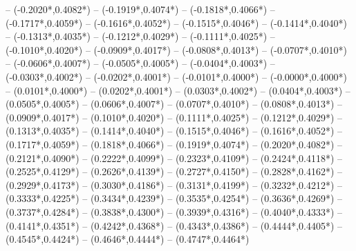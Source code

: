 {	-- ({-0.2020*\dx},{0.4082*\dy})
	-- ({-0.1919*\dx},{0.4074*\dy})
	-- ({-0.1818*\dx},{0.4066*\dy})
	-- ({-0.1717*\dx},{0.4059*\dy})
	-- ({-0.1616*\dx},{0.4052*\dy})
	-- ({-0.1515*\dx},{0.4046*\dy})
	-- ({-0.1414*\dx},{0.4040*\dy})
	-- ({-0.1313*\dx},{0.4035*\dy})
	-- ({-0.1212*\dx},{0.4029*\dy})
	-- ({-0.1111*\dx},{0.4025*\dy})
	-- ({-0.1010*\dx},{0.4020*\dy})
	-- ({-0.0909*\dx},{0.4017*\dy})
	-- ({-0.0808*\dx},{0.4013*\dy})
	-- ({-0.0707*\dx},{0.4010*\dy})
	-- ({-0.0606*\dx},{0.4007*\dy})
	-- ({-0.0505*\dx},{0.4005*\dy})
	-- ({-0.0404*\dx},{0.4003*\dy})
	-- ({-0.0303*\dx},{0.4002*\dy})
	-- ({-0.0202*\dx},{0.4001*\dy})
	-- ({-0.0101*\dx},{0.4000*\dy})
	-- ({-0.0000*\dx},{0.4000*\dy})
	-- ({0.0101*\dx},{0.4000*\dy}) %
	-- ({0.0202*\dx},{0.4001*\dy}) %
	-- ({0.0303*\dx},{0.4002*\dy}) %
	-- ({0.0404*\dx},{0.4003*\dy}) %
	-- ({0.0505*\dx},{0.4005*\dy}) %
	-- ({0.0606*\dx},{0.4007*\dy}) %
	-- ({0.0707*\dx},{0.4010*\dy}) %
	-- ({0.0808*\dx},{0.4013*\dy}) %
	-- ({0.0909*\dx},{0.4017*\dy}) %
	-- ({0.1010*\dx},{0.4020*\dy}) %
	-- ({0.1111*\dx},{0.4025*\dy}) %
	-- ({0.1212*\dx},{0.4029*\dy}) %
	-- ({0.1313*\dx},{0.4035*\dy}) %
	-- ({0.1414*\dx},{0.4040*\dy}) %
	-- ({0.1515*\dx},{0.4046*\dy}) %
	-- ({0.1616*\dx},{0.4052*\dy}) %
	-- ({0.1717*\dx},{0.4059*\dy}) %
	-- ({0.1818*\dx},{0.4066*\dy}) %
	-- ({0.1919*\dx},{0.4074*\dy}) %
	-- ({0.2020*\dx},{0.4082*\dy}) %
	-- ({0.2121*\dx},{0.4090*\dy}) %
	-- ({0.2222*\dx},{0.4099*\dy}) %
	-- ({0.2323*\dx},{0.4109*\dy}) %
	-- ({0.2424*\dx},{0.4118*\dy}) %
	-- ({0.2525*\dx},{0.4129*\dy}) %
	-- ({0.2626*\dx},{0.4139*\dy}) %
	-- ({0.2727*\dx},{0.4150*\dy}) %
	-- ({0.2828*\dx},{0.4162*\dy}) %
	-- ({0.2929*\dx},{0.4173*\dy}) %
	-- ({0.3030*\dx},{0.4186*\dy}) %
	-- ({0.3131*\dx},{0.4199*\dy}) %
	-- ({0.3232*\dx},{0.4212*\dy}) %
	-- ({0.3333*\dx},{0.4225*\dy}) %
	-- ({0.3434*\dx},{0.4239*\dy}) %
	-- ({0.3535*\dx},{0.4254*\dy}) %
	-- ({0.3636*\dx},{0.4269*\dy}) %
	-- ({0.3737*\dx},{0.4284*\dy}) %
	-- ({0.3838*\dx},{0.4300*\dy}) %
	-- ({0.3939*\dx},{0.4316*\dy}) %
	-- ({0.4040*\dx},{0.4333*\dy}) %
	-- ({0.4141*\dx},{0.4351*\dy}) %
	-- ({0.4242*\dx},{0.4368*\dy}) %
	-- ({0.4343*\dx},{0.4386*\dy}) %
	-- ({0.4444*\dx},{0.4405*\dy}) %
	-- ({0.4545*\dx},{0.4424*\dy}) %
	-- ({0.4646*\dx},{0.4444*\dy}) %
	-- ({0.4747*\dx},{0.4464*\dy}) %
}
